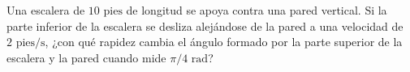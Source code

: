 \item Una escalera de $10 \text{ pies}$ de longitud se apoya contra una pared vertical. Si la parte inferior de la escalera se desliza alejándose de la pared a una velocidad de $2 \text{ pies/s}$, ¿con qué rapidez cambia el ángulo formado por la parte superior de la escalera y la pared cuando mide $\pi/4 \text{ rad}$?
